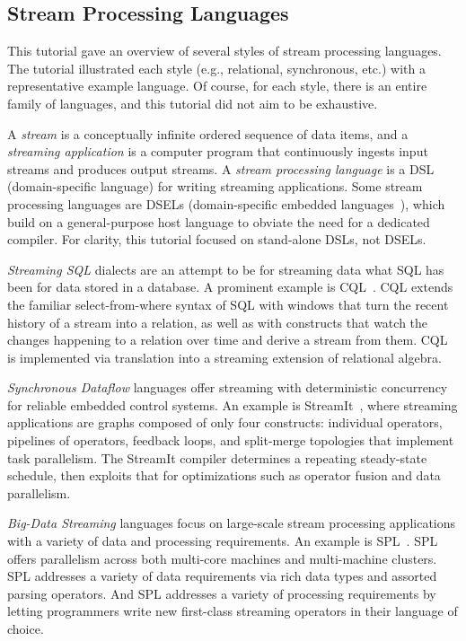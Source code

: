 \subsection{Stream Processing Languages}

This tutorial gave an overview of several styles of stream processing
languages. The tutorial illustrated each style (e.g., relational,
synchronous, etc.) with a representative example language. Of course,
for each style, there is an entire family of languages, and this
tutorial did not aim to be exhaustive.

A \emph{stream} is a conceptually infinite ordered sequence of data
items, and a \emph{streaming application} is a computer program that
continuously ingests input streams and produces output streams.  A
\emph{stream processing language} is a DSL (domain-specific language)
for writing streaming applications. Some stream processing languages
are DSELs (domain-specific embedded languages~\cite{hudak_1998}),
which build on a general-purpose host language to obviate the need for
a dedicated compiler. For clarity, this tutorial focused on
stand-alone DSLs, not DSELs.

\emph{Streaming SQL} dialects are an attempt to be for streaming data
what SQL has been for data stored in a database. A prominent example
is CQL~\cite{arasu_babu_widom_2006}. CQL extends the familiar
select-from-where syntax of SQL with windows that turn the recent
history of a stream into a relation, as well as with constructs that
watch the changes happening to a relation over time and derive a
stream from them. CQL is implemented via translation into a streaming
extension of relational algebra.

\emph{Synchronous Dataflow} languages offer streaming with
deterministic concurrency for reliable embedded control systems. An
example is StreamIt~\cite{thies_et_al_2002}, where streaming
applications are graphs composed of only four constructs: individual
operators, pipe\-lines of operators, feedback loops, and split-merge
topologies that implement task parallelism. The StreamIt compiler
determines a repeating steady-state schedule, then exploits that for
optimizations such as operator fusion and data parallelism.

\emph{Big-Data Streaming} languages focus on large-scale stream
processing applications with a variety of data and processing
requirements. An example is SPL~\cite{hirzel_schneider_gedik_2017}.
SPL offers parallelism across both multi-core machines and
multi-machine clusters. SPL addresses a variety of data requirements
via rich data types and assorted parsing operators. And SPL addresses
a variety of processing requirements by letting programmers write new
first-class streaming operators in their language of choice.

